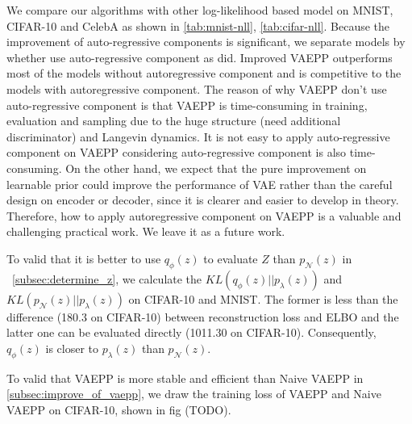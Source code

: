 We compare our algorithms with other log-likelihood based model on MNIST, CIFAR-10 and CelebA as shown in \cref{tab:mnist-nll}, \cref{tab:cifar-nll}. Because the improvement of auto-regressive components is significant, we separate models by whether use auto-regressive component as \cite{maaloe2019biva} did. Improved VAEPP outperforms most of the models without autoregressive component and is competitive to the models with autoregressive component. The reason of why VAEPP don't use auto-regressive component is that VAEPP is time-consuming in training,  evaluation and sampling due to the huge structure (need additional discriminator) and Langevin dynamics. It is not easy to apply auto-regressive component on VAEPP considering auto-regressive component is also time-consuming. 
On the other hand, we expect that the pure improvement on learnable prior could improve the performance of VAE rather than the careful design on encoder or decoder, since it is clearer and easier to develop in theory. Therefore, how to apply autoregressive component on VAEPP is a valuable and challenging practical work. We leave it as a future work.

To valid that it is better to use $q_\phi(z)$ to evaluate $Z$ than $p_\mathcal{N}(z)$ in ~\cref{subsec:determine_z}, we calculate the $KL(q_\phi(z)||p_\lambda(z))$ and $KL(p_\mathcal{N}(z)||p_\lambda(z))$ on CIFAR-10 and MNIST. The former is less than the difference (180.3 on CIFAR-10) between reconstruction loss and ELBO and the latter one can be evaluated directly (1011.30 on CIFAR-10). Consequently, $q_\phi(z)$ is closer to $p_\lambda(z)$ than $p_\mathcal{N}(z)$. 

To valid that VAEPP is more stable and efficient than Naive VAEPP in \cref{subsec:improve_of_vaepp}, we draw the training loss of VAEPP and Naive VAEPP on CIFAR-10, shown in fig (TODO).

